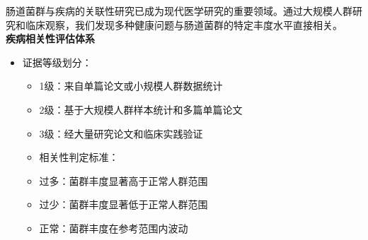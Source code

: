 \documentclass[UTF8]{ctexart}
\begin{document}
\begin{tcolorbox}[
    enhanced,
    colback=customTealBg,
    colframe=customTealBg,
    arc=3mm,
    boxrule=0pt,
    width=\textwidth,
    top=8pt,
    bottom=8pt
]
{\small{\color{customTeal}\faInfoCircle} 肠道菌群与疾病的关联性研究已成为现代医学研究的重要领域。通过大规模人群研究和临床观察，我们发现多种健康问题与肠道菌群的特定丰度水平直接相关。\\

\textbf{疾病相关性评估体系}
\begin{itemize}[]
\item 证据等级划分：

\begin{itemize}
\item 1级：来自单篇论文或小规模人群数据统计
\item 2级：基于大规模人群样本统计和多篇单篇论文
\item 3级：经大量研究论文和临床实践验证
\item 相关性判定标准：
\item 过多：菌群丰度显著高于正常人群范围
\item 过少：菌群丰度显著低于正常人群范围
\item 正常：菌群丰度在参考范围内波动
\end{itemize}
\end{itemize}
}
\end{tcolorbox}
\end{document}
